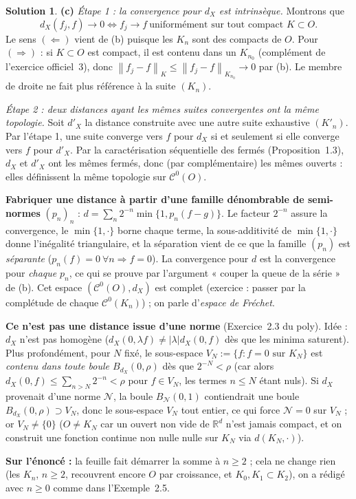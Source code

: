 \documentclass[11pt,a4paper]{article}
\newcommand{\R}{\mathbb{R}}
\newcommand{\norm}[1]{\left\|#1\right\|}
\newcommand{\Cz}{\mathcal{C}^0}
\theoremstyle{definition}
\newtheorem*{solution}{Solution}
\begin{document}
\begin{solution}
\medskip
\noindent\textbf{(c)} \emph{Étape 1 : la convergence pour $d_X$ est intrinsèque.} Montrons que
\[
d_X(f_j,f)\to0\iff f_j\to f\ \text{uniformément sur tout compact } K\subset O .
\]
Le sens $(\Leftarrow)$ vient de (b) puisque les $K_n$ sont des compacts de $O$. Pour $(\Rightarrow)$ : si $K\subset O$ est compact, il est contenu dans un $K_{n_0}$ (complément de l'exercice officiel~3), donc $\norm{f_j-f}_K\le\norm{f_j-f}_{K_{n_0}}\to0$ par (b). Le membre de droite ne fait plus référence à la suite $(K_n)$.

\emph{Étape 2 : deux distances ayant les mêmes suites convergentes ont la même topologie.} Soit $d'_X$ la distance construite avec une autre suite exhaustive $(K'_n)$. Par l'étape 1, une suite converge vers $f$ pour $d_X$ si et seulement si elle converge vers $f$ pour $d'_X$. Par la caractérisation séquentielle des fermés (Proposition~1.3), $d_X$ et $d'_X$ ont les mêmes fermés, donc (par complémentaire) les mêmes ouverts : elles définissent la même topologie sur $\Cz(O)$.
\end{solution}

\begin{pointcle}
\textbf{Fabriquer une distance à partir d'une famille dénombrable de semi-normes} $(p_n)_n$ : $d=\sum_n2^{-n}\min\{1,p_n(f-g)\}$. Le facteur $2^{-n}$ assure la convergence, le $\min\{1,\cdot\}$ borne chaque terme, la sous-additivité de $\min\{1,\cdot\}$ donne l'inégalité triangulaire, et la séparation vient de ce que la famille $(p_n)$ est \emph{séparante} ($p_n(f)=0\ \forall n\Rightarrow f=0$). La convergence pour $d$ est la convergence pour \emph{chaque} $p_n$, ce qui se prouve par l'argument « couper la queue de la série » de (b). Cet espace $(\Cz(O),d_X)$ est complet (exercice : passer par la complétude de chaque $\Cz(K_n)$) ; on parle d'\emph{espace de Fréchet}.
\end{pointcle}

\begin{piege}
\textbf{Ce n'est pas une distance issue d'une norme} (Exercice~2.3 du poly). Idée : $d_X$ n'est pas homogène ($d_X(0,\lambda f)\ne|\lambda|d_X(0,f)$ dès que les minima saturent). Plus profondément, pour $N$ fixé, le sous-espace $V_N:=\{f : f=0\text{ sur }K_N\}$ est \emph{contenu dans toute boule $B_{d_X}(0,\rho)$} dès que $2^{-N}<\rho$ (car alors $d_X(0,f)\le\sum_{n>N}2^{-n}<\rho$ pour $f\in V_N$, les termes $n\le N$ étant nuls). Si $d_X$ provenait d'une norme $\mathcal N$, la boule $B_{\mathcal N}(0,1)$ contiendrait une boule $B_{d_X}(0,\rho)\supset V_N$, donc le sous-espace $V_N$ tout entier, ce qui force $\mathcal N=0$ sur $V_N$ ; or $V_N\ne\{0\}$ ($O\ne K_N$ car un ouvert non vide de $\R^d$ n'est jamais compact, et on construit une fonction continue non nulle nulle sur $K_N$ via $d(K_N,\cdot)$).

\textbf{Sur l'énoncé :} la feuille fait démarrer la somme à $n\ge2$ ; cela ne change rien (les $K_n$, $n\ge2$, recouvrent encore $O$ par croissance, et $K_0,K_1\subset K_2$), on a rédigé avec $n\ge0$ comme dans l'Exemple~2.5.
\end{piege}
\end{document}
